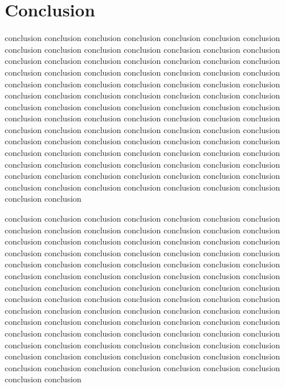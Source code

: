 \documentclass[platex,ja=standard,12pt,a4paper,twoside,onecolumn,fleqn,dvipdfmx,english]{bxjsbook}
\begin{document}
\chapter{Conclusion}
conclusion conclusion conclusion conclusion conclusion conclusion conclusion conclusion conclusion conclusion conclusion conclusion conclusion conclusion conclusion conclusion conclusion conclusion conclusion conclusion conclusion conclusion conclusion conclusion conclusion conclusion conclusion conclusion conclusion conclusion conclusion conclusion conclusion conclusion conclusion conclusion conclusion conclusion conclusion conclusion conclusion conclusion conclusion conclusion conclusion conclusion conclusion conclusion conclusion conclusion conclusion conclusion conclusion conclusion conclusion conclusion conclusion conclusion conclusion conclusion conclusion conclusion conclusion conclusion conclusion conclusion conclusion conclusion conclusion conclusion conclusion conclusion conclusion conclusion conclusion conclusion conclusion conclusion conclusion conclusion conclusion conclusion conclusion conclusion conclusion conclusion conclusion conclusion conclusion conclusion conclusion conclusion conclusion conclusion conclusion conclusion conclusion conclusion conclusion conclusion

conclusion conclusion conclusion conclusion conclusion conclusion conclusion conclusion conclusion conclusion conclusion conclusion conclusion conclusion conclusion conclusion conclusion conclusion conclusion conclusion conclusion conclusion conclusion conclusion conclusion conclusion conclusion conclusion conclusion conclusion conclusion conclusion conclusion conclusion conclusion conclusion conclusion conclusion conclusion conclusion conclusion conclusion conclusion conclusion conclusion conclusion conclusion conclusion conclusion conclusion conclusion conclusion conclusion conclusion conclusion conclusion conclusion conclusion conclusion conclusion conclusion conclusion conclusion conclusion conclusion conclusion conclusion conclusion conclusion conclusion conclusion conclusion conclusion conclusion conclusion conclusion conclusion conclusion conclusion conclusion conclusion conclusion conclusion conclusion conclusion conclusion conclusion conclusion conclusion conclusion conclusion conclusion conclusion conclusion conclusion conclusion conclusion conclusion conclusion conclusion
\end{document}
